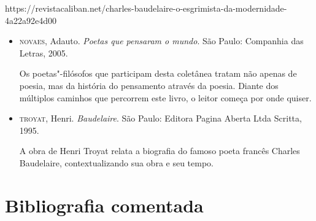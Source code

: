 \documentclass[12pt]{extarticle}
\begin{document}



https://revistacaliban.net/charles-baudelaire-o-esgrimista-da-modernidade-4a22a92e4d00

\begin{itemize}
\item\textsc{novaes}, Adauto. \textit{Poetas que pensaram o mundo}. São Paulo:
Companhia das Letras, 2005.

Os poetas"-filósofos que participam desta coletânea tratam não apenas de
poesia, mas da história do pensamento através da poesia. Diante dos
múltiplos caminhos que percorrem este livro, o leitor começa por onde
quiser.

\item\textsc{troyat}, Henri. \textit{Baudelaire}. São Paulo: Editora Pagina Aberta Ltda Scritta, 1995.

A obra de Henri Troyat relata a biografia do famoso poeta francês
Charles Baudelaire, contextualizando sua obra e seu tempo.
\end{itemize}

\section{Bibliografia comentada}
\end{document}
